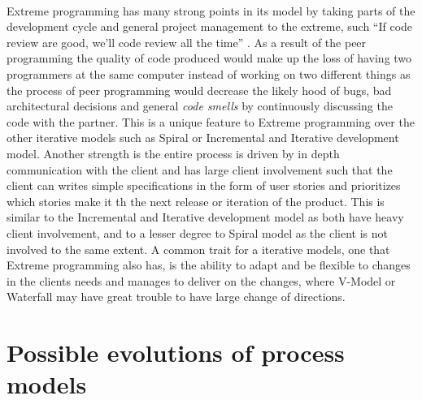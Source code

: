 \documentclass{style/CRPITStyle}
\renewcommand{\cite}{\citep}
\begin{document}
\paragraph{}
Extreme programming has many strong points in its model by taking parts of the
development cycle and general project management to the extreme, such ``If code
review are good, we'll code review all the time'' \cite{beck:2000:xp}. As a
result of the peer programming the quality of code produced would make up the
loss of having two programmers at the same computer instead of working on two
different things as the process of peer programming would decrease the
likely hood of bugs, bad architectural decisions and general \emph{code smells}
by continuously discussing the code with the partner. This is a unique feature
to Extreme programming over the other iterative models such as Spiral or
Incremental and Iterative development model.
Another strength is the entire process is driven by in depth communication with
the client and has large client involvement such that the client can writes simple specifications
in the form of user stories and prioritizes which stories make it th the next
release or iteration of the product. This is similar to the Incremental and Iterative
development model as both have heavy client involvement, and to a lesser degree
to Spiral model as the client is not involved to the same extent.
A common trait for a iterative models, one that Extreme programming also has, is
the ability to adapt and be flexible to changes in the clients needs and manages
to deliver on the changes, where V-Model or Waterfall may have great trouble to have
large change of directions.

\cite{dalalah:2014:xp}
\cite{beck:2000:xp}
\cite{khramtchenko:2004:xp}

\section{Possible evolutions of process models}




\end{document}
